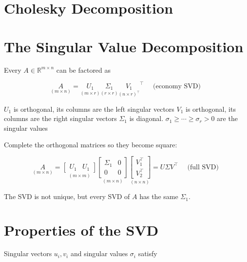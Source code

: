 \documentclass[14pt]{article}
\theoremstyle{definition}
\theoremstyle{remark}
\begin{document}
\headrule

\section{Cholesky Decomposition}



\headrule

\begin{multicols}{2}
    \section{The Singular Value Decomposition}
    Every $A \in \mathbb{R}^{m \times n}$ can be factored as

    $$
        \underset{(m \times n)}{A}=\underset{(m \times r)}{U_{1}} \underset{(r \times r)}{\Sigma_{1}} \underset{(n \times r)^{\top}}{V_{1}}^{\top} \quad \text { (economy SVD) }
    $$

    $U_{1}$ is orthogonal, its columns are the left singular vectors $V_{1}$ is orthogonal, its columns are the right singular vectors $\Sigma_{1}$ is diagonal. $\sigma_{1} \geq \cdots \geq \sigma_{r}>0$ are the singular values

    Complete the orthogonal matrices so they become square:

    $$
        \underset{(m \times n)}{A}=\underset{(m \times m)}{\begin{bmatrix}
                U_{1} & U_{1}
            \end{bmatrix}} \underset{(m \times n)}{\begin{bmatrix}
                \Sigma_{1} & 0 \\
                0          & 0
            \end{bmatrix}} \underset{(n \times n)}{\begin{bmatrix}
                V_{1}^{\top} \\
                V_{2}^{\top}
            \end{bmatrix}}=U \Sigma V^{\top} \quad \text { (full SVD) }
    $$

    The SVD is not unique, but every SVD of $A$ has the same $\Sigma_{1}$.

    \section{Properties of the SVD}
    Singular vectors $u_{i}, v_{i}$ and singular values $\sigma_{i}$ satisfy


\end{multicols}
\end{document}

